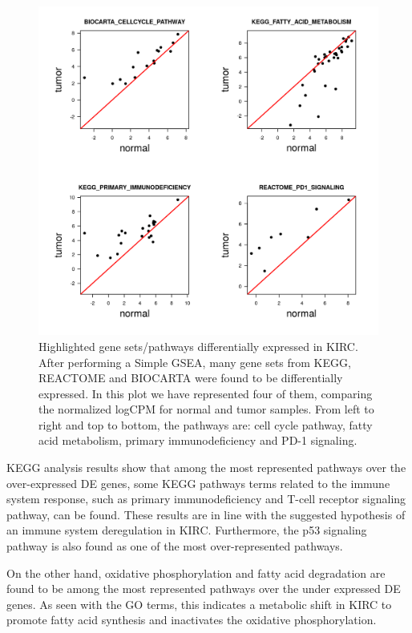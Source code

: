 \documentclass[9pt,twocolumn,twoside]{gsajnl}
\begin{document}
\begin{figure}[htbp]
\centering
\includegraphics[width=\linewidth]{figures/fig3.png}
\caption{Highlighted gene sets/pathways differentially expressed in KIRC. After performing a Simple GSEA, many gene sets from KEGG, REACTOME and BIOCARTA were found to be differentially expressed. In this plot we have represented four of them, comparing the normalized logCPM for normal and tumor samples. From left to right and top to bottom, the pathways are: cell cycle pathway, fatty acid metabolism, primary immunodeficiency and PD-1 signaling.}%
\label{fig:pathways}
\end{figure}


KEGG analysis results show that among the most represented pathways over the over-expressed DE genes, some KEGG pathways terms related to the immune system response, such as primary immunodeficiency and T-cell receptor signaling pathway, can be found.  These results are in line with the suggested hypothesis of an immune system deregulation in KIRC. Furthermore, the p53 signaling pathway is also found as one of the most over-represented pathways.

On the other hand, oxidative phosphorylation and fatty acid degradation are found to be among the most represented pathways over the under expressed DE genes. As seen with the GO terms, this indicates a metabolic shift in KIRC to promote fatty acid synthesis and inactivates the oxidative phosphorylation.
\end{document}
